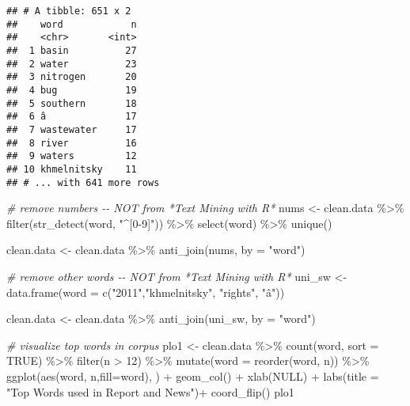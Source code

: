 \documentclass[
]{article}
\newenvironment{Shaded}{\begin{snugshade}}{\end{snugshade}}
\newcommand{\AttributeTok}[1]{\textcolor[rgb]{0.77,0.63,0.00}{#1}}
\newcommand{\CommentTok}[1]{\textcolor[rgb]{0.56,0.35,0.01}{\textit{#1}}}
\newcommand{\ConstantTok}[1]{\textcolor[rgb]{0.00,0.00,0.00}{#1}}
\newcommand{\DecValTok}[1]{\textcolor[rgb]{0.00,0.00,0.81}{#1}}
\newcommand{\FunctionTok}[1]{\textcolor[rgb]{0.00,0.00,0.00}{#1}}
\newcommand{\NormalTok}[1]{#1}
\newcommand{\OtherTok}[1]{\textcolor[rgb]{0.56,0.35,0.01}{#1}}
\newcommand{\SpecialCharTok}[1]{\textcolor[rgb]{0.00,0.00,0.00}{#1}}
\newcommand{\StringTok}[1]{\textcolor[rgb]{0.31,0.60,0.02}{#1}}
\begin{document}
\begin{verbatim}
## # A tibble: 651 x 2
##    word            n
##    <chr>       <int>
##  1 basin          27
##  2 water          23
##  3 nitrogen       20
##  4 bug            19
##  5 southern       18
##  6 â              17
##  7 wastewater     17
##  8 river          16
##  9 waters         12
## 10 khmelnitsky    11
## # ... with 641 more rows
\end{verbatim}

\begin{Shaded}
\begin{Highlighting}[]
\CommentTok{\# remove numbers {-}{-} NOT from *Text Mining with R*}
\NormalTok{nums }\OtherTok{\textless{}{-}}\NormalTok{ clean.data }\SpecialCharTok{\%\textgreater{}\%} \FunctionTok{filter}\NormalTok{(}\FunctionTok{str\_detect}\NormalTok{(word, }\StringTok{"\^{}[0{-}9]"}\NormalTok{)) }\SpecialCharTok{\%\textgreater{}\%} \FunctionTok{select}\NormalTok{(word) }\SpecialCharTok{\%\textgreater{}\%} \FunctionTok{unique}\NormalTok{()}

\NormalTok{clean.data }\OtherTok{\textless{}{-}}\NormalTok{ clean.data }\SpecialCharTok{\%\textgreater{}\%}
  \FunctionTok{anti\_join}\NormalTok{(nums, }\AttributeTok{by =} \StringTok{"word"}\NormalTok{)}

\CommentTok{\# remove other words {-}{-} NOT from *Text Mining with R*}
\NormalTok{uni\_sw }\OtherTok{\textless{}{-}} \FunctionTok{data.frame}\NormalTok{(}\AttributeTok{word =} \FunctionTok{c}\NormalTok{(}\StringTok{"2011"}\NormalTok{,}\StringTok{"khmelnitsky"}\NormalTok{, }\StringTok{"rights"}\NormalTok{, }\StringTok{"â"}\NormalTok{))}

\NormalTok{clean.data }\OtherTok{\textless{}{-}}\NormalTok{ clean.data }\SpecialCharTok{\%\textgreater{}\%}
  \FunctionTok{anti\_join}\NormalTok{(uni\_sw, }\AttributeTok{by =} \StringTok{"word"}\NormalTok{)}

\CommentTok{\# visualize top words in corpus}
\NormalTok{plo1 }\OtherTok{\textless{}{-}}\NormalTok{ clean.data }\SpecialCharTok{\%\textgreater{}\%}
  \FunctionTok{count}\NormalTok{(word, }\AttributeTok{sort =} \ConstantTok{TRUE}\NormalTok{) }\SpecialCharTok{\%\textgreater{}\%}
  \FunctionTok{filter}\NormalTok{(n }\SpecialCharTok{\textgreater{}} \DecValTok{12}\NormalTok{) }\SpecialCharTok{\%\textgreater{}\%}
  \FunctionTok{mutate}\NormalTok{(}\AttributeTok{word =} \FunctionTok{reorder}\NormalTok{(word, n)) }\SpecialCharTok{\%\textgreater{}\%}
  \FunctionTok{ggplot}\NormalTok{(}\FunctionTok{aes}\NormalTok{(word, n,}\AttributeTok{fill=}\NormalTok{word), ) }\SpecialCharTok{+}
  \FunctionTok{geom\_col}\NormalTok{() }\SpecialCharTok{+}
  \FunctionTok{xlab}\NormalTok{(}\ConstantTok{NULL}\NormalTok{) }\SpecialCharTok{+}
  \FunctionTok{labs}\NormalTok{(}\AttributeTok{title =} \StringTok{"Top Words used in Report and News"}\NormalTok{)}\SpecialCharTok{+}
  \FunctionTok{coord\_flip}\NormalTok{()}
\NormalTok{plo1}
\end{Highlighting}
\end{Shaded}
\end{document}
